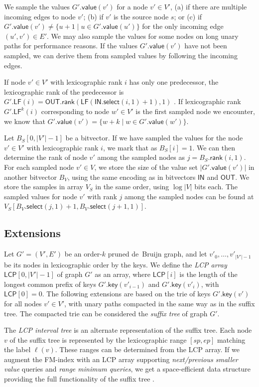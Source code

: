 \documentclass[a4paper,UKenglish]{lipics-v2016}
\newcommand{\set}[1]{\ensuremath{\{ #1 \}}}
\newcommand{\abs}[1]{\ensuremath{\lvert #1 \rvert}}
\newcommand{\rank}{\ensuremath{\mathsf{rank}}}
\newcommand{\select}{\ensuremath{\mathsf{select}}}
\newcommand{\LF}{\ensuremath{\mathsf{LF}}}
\newcommand{\gkey}{\ensuremath{\mathsf{key}}}
\newcommand{\gvalue}{\ensuremath{\mathsf{value}}}
\newcommand{\orderk}[1]{order\nobreakdash-$#1$}
\newcommand{\LCP}{\ensuremath{\mathsf{LCP}}}
\newcommand{\bvIN}{\ensuremath{\mathsf{IN}}}
\newcommand{\bvOUT}{\ensuremath{\mathsf{OUT}}}
\begin{document}
We sample the values $G'.\gvalue(v')$ for a node $v' \in V'$, (a) if there are multiple incoming edges to node $v'$; (b) if $v'$ is the source node $s$; or (c) if $G'.\gvalue(v') \ne \set{u+1 \mid u \in G'.\gvalue(u')}$ for the only incoming edge $(u', v') \in E'$. We may also sample the values for some nodes on long unary paths for performance reasons. If the values $G'.\gvalue(v')$ have not been sampled, we can derive them from sampled values by following the incoming edges.

If node $v' \in V'$ with lexicographic rank $i$ has only one predecessor, the lexicographic rank of the predecessor is $G'.\LF(i) = \bvOUT.\rank(\LF(\bvIN.\select(i, 1) + 1), 1)$ . If lexicographic rank $G'.\LF^{k}(i)$ corresponding to node $w' \in V'$ is the first sampled node we encounter, we know that $G'.\gvalue(v') = \set{w+k \mid w \in G'.\gvalue(w')}$.

Let $B_{S}[0, \abs{V'}-1]$ be a bitvector. If we have sampled the values for the node $v' \in V'$ with lexicographic rank $i$, we mark that as $B_{S}[i] = 1$. We can then determine the rank of node $v'$ among the sampled nodes as $j = B_{S}.\rank(i, 1)$. For each sampled node $v' \in V$, we store the size of the value set $\abs{G'.\gvalue(v')}$ in another bitvector $B_{V}$, using the same encoding as in bitvectors $\bvIN$ and $\bvOUT$. We store the samples in array $V_{S}$ in the same order, using $\log \abs{V}$ bits each. The sampled values for node $v'$ with rank $j$ among the sampled nodes can be found at $V_{S}[B_{V}.\select(j, 1) + 1, B_{V}.\select(j+1, 1)]$.

\subsection{Extensions}

Let $G' = (V', E')$ be an \orderk{k} pruned de~Bruijn graph, and let $v'_{0}, \dotsc, v'_{\abs{V'}-1}$ be its nodes in lexicographic order by the keys. We define the \emph{LCP array} $\LCP[0, \abs{V'}-1]$ of graph $G'$ as an array, where $\LCP[i]$ is the length of the longest common prefix of keys $G'.\gkey(v'_{i-1})$ and $G'.\gkey(v'_{i})$, with $\LCP[0] = 0$. The following extensions are based on the trie of keys $G'.\gkey(v')$ for all nodes $v' \in V'$, with unary paths compacted in the same way as in the suffix tree. The compacted trie can be considered the \emph{suffix tree} of graph $G'$.

The \emph{LCP interval tree} \cite{Abouelhoda2004} is an alternate representation of the suffix tree. Each node $v$ of the suffix tree is represented by the lexicographic range $[sp, ep]$ matching the label $\ell(v)$. These ranges can be determined from the LCP array. If we augment the FM\nobreakdash-index with an LCP array supporting \emph{next/previous smaller value} queries and \emph{range minimum queries}, we get a space-efficient data structure providing the full functionality of the suffix tree \cite{Fischer2009a}.
\end{document}
